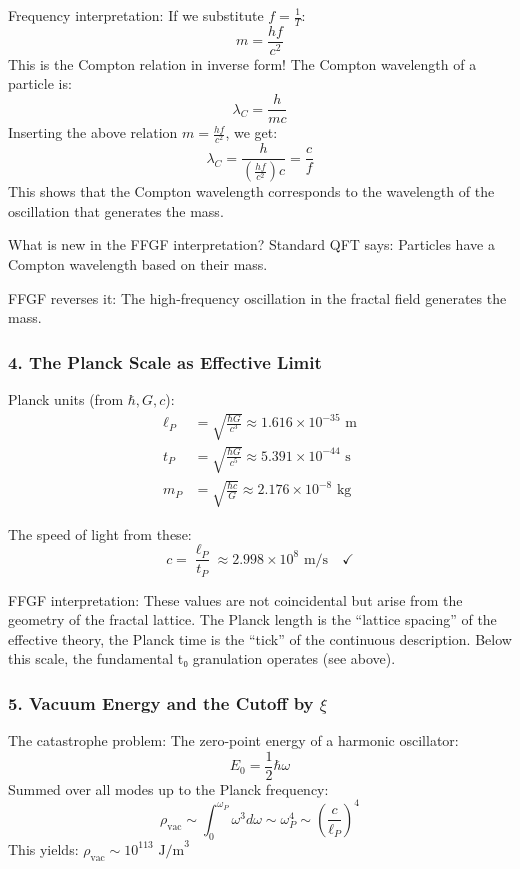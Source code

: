	Frequency interpretation:
	If we substitute \( f = \frac{1}{T} \):
	\[
	m = \frac{hf}{c^2}
	\]
	This is the Compton relation in inverse form! The Compton wavelength of a particle is:
	\[
	\lambda_C = \frac{h}{mc}
	\]
	Inserting the above relation \( m = \frac{hf}{c^2} \), we get:
	\[
	\lambda_C = \frac{h}{\left(\frac{hf}{c^2}\right)c} = \frac{c}{f}
	\]
	This shows that the Compton wavelength corresponds to the wavelength of the oscillation that generates the mass.
	
	What is new in the FFGF interpretation?
	Standard QFT says: Particles have a Compton wavelength based on their mass.
	
	FFGF reverses it: The high-frequency oscillation in the fractal field generates the mass.
	
	\subsubsection{4. The Planck Scale as Effective Limit}
	Planck units (from \( \hbar, G, c \)):
	\begin{align}
		\ell_P &= \sqrt{\frac{\hbar G}{c^3}} \approx 1.616 \times 10^{-35} \text{ m} \\
		t_P &= \sqrt{\frac{\hbar G}{c^5}} \approx 5.391 \times 10^{-44} \text{ s} \\
		m_P &= \sqrt{\frac{\hbar c}{G}} \approx 2.176 \times 10^{-8} \text{ kg}
	\end{align}
	
	The speed of light from these:
	\[
	c = \frac{\ell_P}{t_P} \approx 2.998 \times 10^8 \text{ m/s} \quad \checkmark
	\]
	
	FFGF interpretation:
	These values are not coincidental but arise from the geometry of the fractal lattice. The Planck length is the ``lattice spacing'' of the effective theory, the Planck time is the ``tick'' of the continuous description. Below this scale, the fundamental t₀ granulation operates (see above).
	
	\subsubsection{5. Vacuum Energy and the Cutoff by \( \xi \)}
	The catastrophe problem:
	The zero-point energy of a harmonic oscillator:
	\[
	E_0 = \frac{1}{2}\hbar\omega
	\]
	Summed over all modes up to the Planck frequency:
	\[
	\rho_{\text{vac}} \sim \int_0^{\omega_P} \omega^3 d\omega \sim \omega_P^4 \sim \left(\frac{c}{\ell_P}\right)^4
	\]
	This yields: \( \rho_{\text{vac}} \sim 10^{113} \text{ J/m}^3 \)
	
